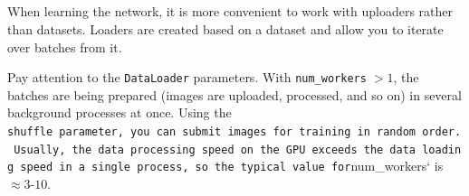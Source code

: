\documentclass[11pt]{article}
\begin{document}
    \begin{center}
    \end{center}
    { \hspace*{\fill} \\}
    
    \begin{center}
    \end{center}
    { \hspace*{\fill} \\}
    
    \begin{center}
    \end{center}
    { \hspace*{\fill} \\}
    
    \begin{center}
    \end{center}
    { \hspace*{\fill} \\}
    
    When learning the network, it is more convenient to work with uploaders
rather than datasets. Loaders are created based on a dataset and allow
you to iterate over batches from it.

Pay attention to the \texttt{DataLoader} parameters. With
\texttt{num\_workers}\(\;> 1\), the batches are being prepared (images
are uploaded, processed, and so on) in several background processes at
once. Using the
\texttt{shuffle\textquotesingle{}\ parameter,\ you\ can\ submit\ images\ for\ training\ in\ random\ order.\ Usually,\ the\ data\ processing\ speed\ on\ the\ GPU\ exceeds\ the\ data\ loading\ speed\ in\ a\ single\ process,\ so\ the\ typical\ value\ for}num\_workers`
is\(\approx 3\text{-}10\).
\end{document}
